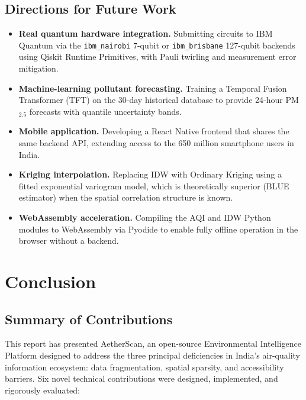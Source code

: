\documentclass[12pt,a4paper]{article}
\begin{document}
\subsection{Directions for Future Work}
\label{sec:discussion:future}

\begin{itemize}[leftmargin=*]
\item \textbf{Real quantum hardware integration.} Submitting circuits to
      IBM Quantum via the \texttt{ibm\_nairobi} 7-qubit or \texttt{ibm\_brisbane}
      127-qubit backends using Qiskit Runtime Primitives, with Pauli twirling
      and measurement error mitigation.
\item \textbf{Machine-learning pollutant forecasting.} Training a
      Temporal Fusion Transformer (TFT) on the 30-day historical database
      to provide 24-hour PM$_{2.5}$ forecasts with quantile uncertainty bands.
\item \textbf{Mobile application.} Developing a React Native frontend
      that shares the same backend API, extending access to the 650 million
      smartphone users in India.
\item \textbf{Kriging interpolation.} Replacing IDW with Ordinary Kriging
      using a fitted exponential variogram model, which is theoretically
      superior (BLUE estimator) when the spatial correlation structure is
      known.
\item \textbf{WebAssembly acceleration.} Compiling the AQI and IDW Python
      modules to WebAssembly via Pyodide to enable fully offline operation
      in the browser without a backend.
\end{itemize}

\clearpage

\section{Conclusion}
\label{sec:conclusion}

\subsection{Summary of Contributions}
\label{sec:conclusion:summary}

This report has presented AetherScan, an open-source Environmental
Intelligence Platform designed to address the three principal deficiencies
in India's air-quality information ecosystem: data fragmentation, spatial
sparsity, and accessibility barriers. Six novel technical contributions
were designed, implemented, and rigorously evaluated:
\end{document}
